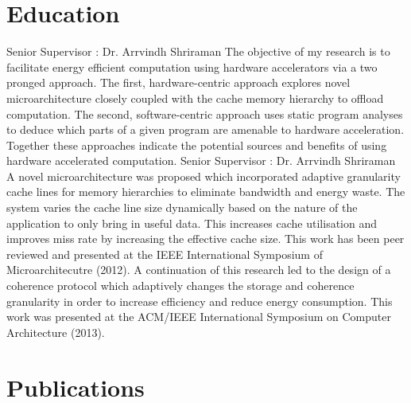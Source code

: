 \documentclass[10pt,letterpaper,sans]{moderncv}   %
\begin{document}
\section{Education}
        {Senior Supervisor : Dr. Arrvindh Shriraman \newline{} The objective of my research is to facilitate energy efficient computation using hardware accelerators via a two pronged approach. The first, hardware-centric approach explores novel microarchitecture closely coupled with the cache memory hierarchy to offload computation. The second, software-centric approach uses static program analyses to deduce which parts of a given program are amenable to hardware acceleration. Together these approaches indicate the potential sources and benefits of using hardware accelerated computation.}
        \vspace{9pt}
        {Senior Supervisor : Dr. Arrvindh Shriraman \newline{} A novel microarchitecture was proposed which incorporated adaptive granularity cache lines for memory hierarchies to eliminate bandwidth and energy waste. The system varies the cache line size dynamically based on the nature of the application to only bring in useful data. This increases cache utilisation and improves miss rate by increasing the effective cache size. This work has been peer reviewed and presented at the IEEE International Symposium of Microarchitecutre (2012). A continuation of this research led to the design of a coherence protocol which adaptively changes the storage and coherence granularity in order to increase efficiency and reduce energy consumption. This work was presented at the ACM/IEEE International Symposium on Computer Architecture (2013).}  
        \vspace{9pt}

\section{Publications}
\nocite{*}

  
\end{document}
